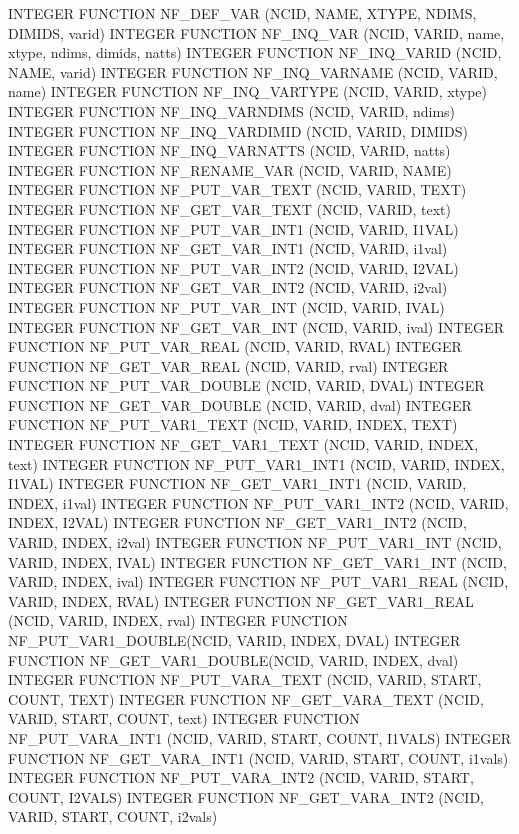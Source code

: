 \begin{DoxyCode}
INTEGER FUNCTION  NF\_DEF\_VAR        (NCID, NAME, XTYPE, NDIMS, DIMIDS,
                                     varid)
INTEGER FUNCTION  NF\_INQ\_VAR        (NCID, VARID, name, xtype, ndims,
                                     dimids, natts)
INTEGER FUNCTION  NF\_INQ\_VARID      (NCID, NAME, varid)
INTEGER FUNCTION  NF\_INQ\_VARNAME    (NCID, VARID, name)
INTEGER FUNCTION  NF\_INQ\_VARTYPE    (NCID, VARID, xtype)
INTEGER FUNCTION  NF\_INQ\_VARNDIMS   (NCID, VARID, ndims)
INTEGER FUNCTION  NF\_INQ\_VARDIMID   (NCID, VARID, DIMIDS)
INTEGER FUNCTION  NF\_INQ\_VARNATTS   (NCID, VARID, natts)
INTEGER FUNCTION  NF\_RENAME\_VAR     (NCID, VARID, NAME)
INTEGER FUNCTION  NF\_PUT\_VAR\_TEXT   (NCID, VARID, TEXT)
INTEGER FUNCTION  NF\_GET\_VAR\_TEXT   (NCID, VARID, text)
INTEGER FUNCTION  NF\_PUT\_VAR\_INT1   (NCID, VARID, I1VAL)
INTEGER FUNCTION  NF\_GET\_VAR\_INT1   (NCID, VARID, i1val)
INTEGER FUNCTION  NF\_PUT\_VAR\_INT2   (NCID, VARID, I2VAL)
INTEGER FUNCTION  NF\_GET\_VAR\_INT2   (NCID, VARID, i2val)
INTEGER FUNCTION  NF\_PUT\_VAR\_INT    (NCID, VARID, IVAL)
INTEGER FUNCTION  NF\_GET\_VAR\_INT    (NCID, VARID, ival)
INTEGER FUNCTION  NF\_PUT\_VAR\_REAL   (NCID, VARID, RVAL)
INTEGER FUNCTION  NF\_GET\_VAR\_REAL   (NCID, VARID, rval)
INTEGER FUNCTION  NF\_PUT\_VAR\_DOUBLE (NCID, VARID, DVAL)
INTEGER FUNCTION  NF\_GET\_VAR\_DOUBLE (NCID, VARID, dval)
INTEGER FUNCTION  NF\_PUT\_VAR1\_TEXT  (NCID, VARID, INDEX, TEXT)
INTEGER FUNCTION  NF\_GET\_VAR1\_TEXT  (NCID, VARID, INDEX, text)
INTEGER FUNCTION  NF\_PUT\_VAR1\_INT1  (NCID, VARID, INDEX, I1VAL)
INTEGER FUNCTION  NF\_GET\_VAR1\_INT1  (NCID, VARID, INDEX, i1val)
INTEGER FUNCTION  NF\_PUT\_VAR1\_INT2  (NCID, VARID, INDEX, I2VAL)
INTEGER FUNCTION  NF\_GET\_VAR1\_INT2  (NCID, VARID, INDEX, i2val)
INTEGER FUNCTION  NF\_PUT\_VAR1\_INT   (NCID, VARID, INDEX, IVAL)
INTEGER FUNCTION  NF\_GET\_VAR1\_INT   (NCID, VARID, INDEX, ival)
INTEGER FUNCTION  NF\_PUT\_VAR1\_REAL  (NCID, VARID, INDEX, RVAL)
INTEGER FUNCTION  NF\_GET\_VAR1\_REAL  (NCID, VARID, INDEX, rval)
INTEGER FUNCTION  NF\_PUT\_VAR1\_DOUBLE(NCID, VARID, INDEX, DVAL)
INTEGER FUNCTION  NF\_GET\_VAR1\_DOUBLE(NCID, VARID, INDEX, dval)
INTEGER FUNCTION  NF\_PUT\_VARA\_TEXT  (NCID, VARID, START, COUNT, TEXT)
INTEGER FUNCTION  NF\_GET\_VARA\_TEXT  (NCID, VARID, START, COUNT, text)
INTEGER FUNCTION  NF\_PUT\_VARA\_INT1  (NCID, VARID, START, COUNT, I1VALS)
INTEGER FUNCTION  NF\_GET\_VARA\_INT1  (NCID, VARID, START, COUNT, i1vals)
INTEGER FUNCTION  NF\_PUT\_VARA\_INT2  (NCID, VARID, START, COUNT, I2VALS)
INTEGER FUNCTION  NF\_GET\_VARA\_INT2  (NCID, VARID, START, COUNT, i2vals)

\end{DoxyCode}
